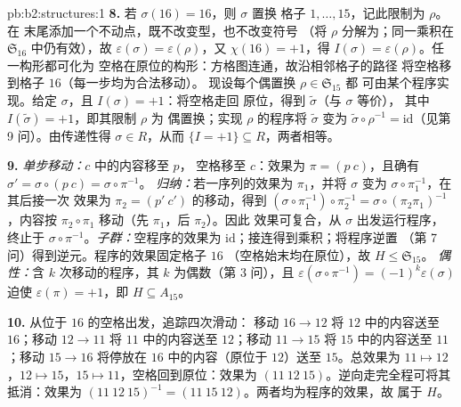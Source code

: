 \begin{solution}{pb:b2:structures:1}
\textbf{8.} 若 $\sigma(16) = 16$，则 $\sigma$ 置换
格子 $1, \dots, 15$，记此限制为 $\rho$。在
末尾添加一个不动点，既不改变型，也不改变符号
（将 $\rho$ 分解为；同一乘积在
$\mathfrak{S}_{16}$ 中仍有效），故 $\varepsilon(\sigma) =
\varepsilon(\rho)$，又 $\chi(16) = +1$，得 $I(\sigma) =
\varepsilon(\rho)$。任一构形都可化为
空格在原位的构形：方格图连通，故沿相邻格子的路径
将空格移到格子 $16$（每一步均为合法移动）。
现设每个偶置换 $\rho \in \mathfrak{S}_{15}$ 都
可由某个程序实现。给定 $\sigma$，且 $I(\sigma) = +1$：将空格走回
原位，得到 $\widetilde\sigma$（与 $\sigma$ 等价），
其中 $I(\widetilde\sigma) = +1$，即其限制 $\rho$ 为
偶置换；实现 $\rho$ 的程序将 $\widetilde\sigma$ 变为
$\widetilde\sigma \circ \rho^{-1} = \mathrm{id}$（见第
9 问）。由传递性得 $\sigma \in R$，从而 $\{I = +1\} \subseteq
R$，两者相等。

\textbf{9.} \emph{单步移动：}$c$ 中的内容移至 $p$，
空格移至 $c$：效果为 $\pi = (p\ c)$，且确有
$\sigma' = \sigma \circ (p\ c) = \sigma \circ \pi^{-1}$。
\emph{归纳：}若一序列的效果为 $\pi_1$，并将
$\sigma$ 变为 $\sigma \circ \pi_1^{-1}$，在其后接一次
效果为 $\pi_2 = (p'\ c')$ 的移动，得到 $(\sigma \circ \pi_1^{-1})
\circ \pi_2^{-1} = \sigma \circ (\pi_2\pi_1)^{-1}$，内容按
$\pi_2 \circ \pi_1$ 移动（先 $\pi_1$，后 $\pi_2$）。因此
效果可复合，从 $\sigma$ 出发运行程序，终止于 $\sigma
\circ \pi^{-1}$。\emph{子群：}空程序的效果为
$\mathrm{id}$；接连得到乘积；将程序逆置
（第 7 问）得到逆元。程序的效果固定格子 $16$
（空格始末均在原位），故 $H \leq \mathfrak{S}_{15}$。
\emph{偶性：}含 $k$ 次移动的程序，其 $k$ 为偶数（第
3 问），且 $\varepsilon(\sigma \circ \pi^{-1}) =
(-1)^k\varepsilon(\sigma)$ 迫使 $\varepsilon(\pi) = +1$，即 $H
\subseteq A_{15}$。

\textbf{10.} 从位于 $16$ 的空格出发，追踪四次滑动：
移动 $16 \to 12$ 将 $12$ 中的内容送至 $16$；移动 $12 \to 11$
将 $11$ 中的内容送至 $12$；移动 $11 \to 15$ 将
$15$ 中的内容送至 $11$；移动 $15 \to 16$ 将停放在
$16$ 中的内容（原位于 $12$）送至 $15$。总效果为 $11 \mapsto
12$，$12 \mapsto 15$，$15 \mapsto 11$，空格回到原位：效果为
$(11\ 12\ 15)$。逆向走完全程可将其抵消：效果为 $(11\ 12\
15)^{-1} = (11\ 15\ 12)$。两者均为程序的效果，故
属于 $H$。


\end{solution}
